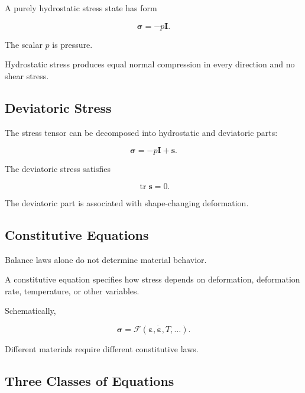 A purely hydrostatic stress state has form

\[
\boxed{
\boldsymbol{\sigma}
=
-p\mathbf{I}.
}
\]

The scalar \(p\) is pressure.

Hydrostatic stress produces equal normal compression in every direction and
no shear stress.

\subsection{Deviatoric Stress}
\label{subsec:deviatoric-stress}

The stress tensor can be decomposed into hydrostatic and deviatoric parts:

\[
\boxed{
\boldsymbol{\sigma}
=
-p\mathbf{I}
+
\mathbf{s}.
}
\]

The deviatoric stress satisfies

\[
\boxed{
\operatorname{tr}\mathbf{s}
=
0.
}
\]

The deviatoric part is associated with shape-changing deformation.

\subsection{Constitutive Equations}
\label{subsec:constitutive-equations}

Balance laws alone do not determine material behavior.

A constitutive equation specifies how stress depends on deformation,
deformation rate, temperature, or other variables.

Schematically,

\[
\boxed{
\boldsymbol{\sigma}
=
\mathcal{F}
(
\boldsymbol{\varepsilon},
\dot{\boldsymbol{\varepsilon}},
T,\ldots
).
}
\]

Different materials require different constitutive laws.

\subsection{Three Classes of Equations}
\label{subsec:three-continuum-equation-classes}

